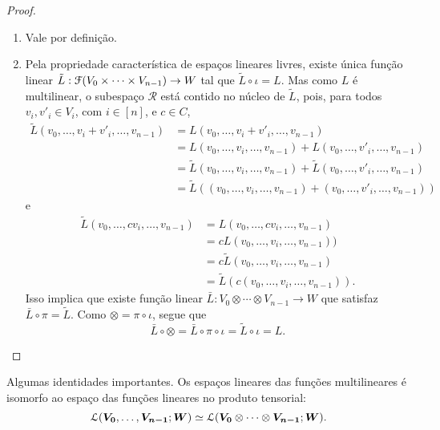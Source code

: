 \begin{proof}
	\begin{enumerate}
	\item Vale por definição.
	
	\item Pela propriedade característica de espaços lineares livres, existe única função linear $\tilde L: \mathcal{F}(V_0 \times \cdots \times V_{n-1}) \to W$ tal que $\tilde L \circ \iota = L$. Mas como $L$ é multilinear, o subespaço $\mathcal R$ está contido no núcleo de $\tilde L$, pois, para todos $v_i,v'_i \in V_i$, com $i \in [n]$, e $c \in C$,
	\begin{align*}
	\tilde L(v_0,\ldots,v_i+v'_i,\ldots,v_{n-1}) &= L(v_0,\ldots,v_i+v'_i,\ldots,v_{n-1}) \\
		&=L(v_0,\ldots,v_i,\ldots,v_{n-1}) + L(v_0,\ldots,v'_i,\ldots,v_{n-1}) \\
		&=\tilde L(v_0,\ldots,v_i,\ldots,v_{n-1}) + \tilde L(v_0,\ldots,v'_i,\ldots,v_{n-1}) \\
		&=\tilde L((v_0,\ldots,v_i,\ldots,v_{n-1}) + (v_0,\ldots,v'_i,\ldots,v_{n-1}))
	\end{align*}
e
	\begin{align*}
	\tilde L(v_0,\ldots,cv_i,\ldots,v_{n-1}) &= L(v_0,\ldots,cv_i,\ldots,v_{n-1}) \\
		&=cL(v_0,\ldots,v_i,\ldots,v_{n-1})) \\
		&= c\tilde L(v_0,\ldots,v_i,\ldots,v_{n-1}) \\
		&= \tilde L(c(v_0,\ldots,v_i,\ldots,v_{n-1})).
	\end{align*}
Isso implica que existe função linear $\bar L: V_0 \otimes \cdots \otimes V_{n-1} \to W$ que satisfaz $\bar L \circ \pi = \tilde L$. Como $\otimes = \pi \circ \iota$, segue que
	\begin{equation*}
	\bar L \circ \otimes = \bar L \circ \pi \circ \iota = \tilde L \circ \iota = L.
	\end{equation*}
	\end{enumerate}

\end{proof}

Algumas identidades importantes. Os espaços lineares das funções multilineares é isomorfo ao espaço das funções lineares no produto tensorial:
	\begin{equation*}
	\mathcal{L}(\bm{V_0},\ldots,\bm{V_{n-1}};\bm W) \simeq \mathcal{L}(\bm{V_0} \otimes \cdots \otimes \bm{V_{n-1}};\bm W).
	\end{equation*}

